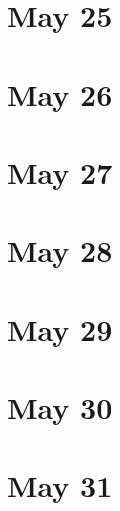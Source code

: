 \section{May 25}

\section{May 26}

\section{May 27}

\section{May 28}

\section{May 29}

\section{May 30}

\section{May 31}

